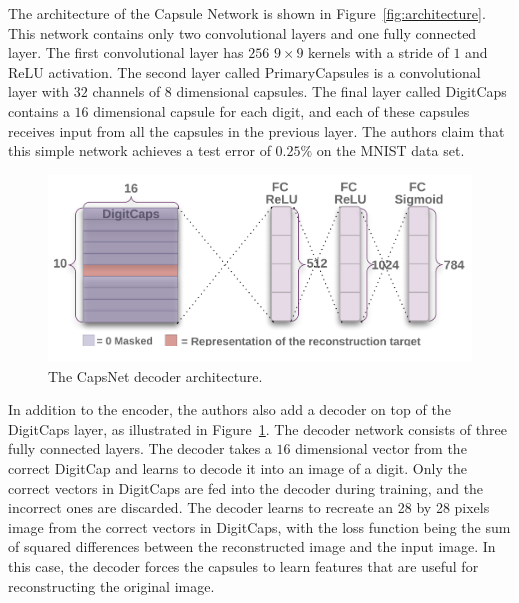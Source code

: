 \documentclass{article}
\begin{document}
The architecture of the Capsule Network is shown in Figure~\ref{fig:architecture}. This network contains only two convolutional layers and one fully connected layer. The first convolutional layer has $256$ $9\times 9$ kernels with a stride of $1$ and ReLU activation. The second layer called PrimaryCapsules is a convolutional layer with $32$ channels of $8$ dimensional capsules. The final layer called DigitCaps contains a $16$ dimensional capsule for each digit, and each of these capsules receives input from all the capsules in the previous layer. The authors claim that this simple network achieves a test error of $0.25\%$ on the MNIST data set. 

\begin{figure}[!htb]
	\centering\includegraphics[width=.8\textwidth]{fig//decoder}
	\caption{The CapsNet decoder architecture.}\label{fig:decoder}
\end{figure}

In addition to the encoder, the authors also add a decoder on top of the DigitCaps layer, as illustrated in Figure~\ref{fig:decoder}. The decoder network consists of three fully connected layers. The decoder takes a $16$ dimensional vector from the correct DigitCap and learns to decode it into an image of a digit. Only the correct vectors in DigitCaps are fed into the decoder during training, and the incorrect ones are discarded. The decoder learns to recreate an 28 by 28 pixels image from the correct vectors in DigitCaps, with the loss function being the sum of squared differences between the reconstructed image and the input image. In this case, the decoder forces the capsules to learn features that are useful for reconstructing the original image. 







\end{document}
